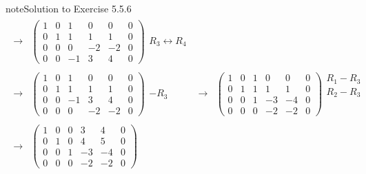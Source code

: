 \documentclass[letterpaper,10pt,english]{jupyterBook}
\begin{document}
\begin{sphinxadmonition}{note}{Solution to Exercise 5.5.6}
\begin{equation*}
\begin{split}
\begin{align*}
    \longrightarrow &
    \left( \begin{array}{ccccc|c}
        1 & 0 & 1 & 0 & 0 & 0 \\
        0 & 1 & 1 & 1 & 1 & 0 \\
        0 & 0 & 0 & -2 & -2 & 0 \\
        0 & 0 & -1 & 3 & 4 & 0
    \end{array} \right)
    \begin{matrix} \\ \\ R_3 \leftrightarrow R_4 \\ \phantom{x} \end{matrix} \\ \\
    \longrightarrow &
    \left( \begin{array}{ccccc|c}
        1 & 0 & 1 & 0 & 0 & 0 \\
        0 & 1 & 1 & 1 & 1 & 0 \\
        0 & 0 & -1 & 3 & 4 & 0 \\
        0 & 0 & 0 & -2 & -2 & 0 
    \end{array} \right)
    \begin{matrix} \\ \\ -R_3 \\ \phantom{x} \end{matrix} &
    \longrightarrow &
    \left( \begin{array}{ccccc|c}
        1 & 0 & 1 & 0 & 0 & 0 \\
        0 & 1 & 1 & 1 & 1 & 0 \\
        0 & 0 & 1 & -3 & -4 & 0 \\
        0 & 0 & 0 & -2 & -2 & 0 
    \end{array} \right)
    \begin{matrix} R_1 - R_3 \\ R_2 - R_3 \\ \phantom{x} \\ \phantom{x} \end{matrix} \\ \\
    \longrightarrow &
    \left( \begin{array}{ccccc|c}
        1 & 0 & 0 & 3 & 4 & 0 \\
        0 & 1 & 0 & 4 & 5 & 0 \\
        0 & 0 & 1 & -3 & -4 & 0 \\
        0 & 0 & 0 & -2 & -2 & 0 
    \end{array} \right) 

\end{align*}
\end{split}
\end{equation*}
\end{sphinxadmonition}
\end{document}
